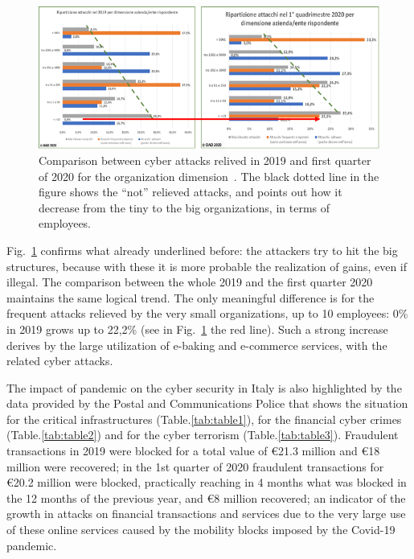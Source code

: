 \documentclass{easychair}
\begin{document}
\begin{figure}
	\centering
		\includegraphics[width=1\textwidth]{pictures/fig3.png}
		\caption{Comparison between cyber attacks relived in 2019 and first quarter of 2020 for the organization dimension~\cite{oad20}. The black dotted line in the figure shows 
the “not” relieved attacks, and points out how it decrease from the tiny to the big organizations, in terms of employees. }
		\label{fig:3}
\end{figure}

Fig.~\ref{fig:3} confirms what already underlined before: the attackers try to hit the big structures, because with these it is more probable the realization of gains, even if illegal.
The comparison between the whole 2019 and the first quarter 2020 maintains the same logical trend. The only meaningful difference is for the frequent attacks relieved by the very
small organizations, up to 10 employees: 0\% in 2019 grows up to 22,2\% (see in Fig.~\ref{fig:3} the red line). Such a strong increase derives by the large utilization of e-baking and 
e-commerce services, with the related cyber attacks.

The impact of pandemic on the cyber security in Italy is also highlighted by the data provided by the Postal and Communications Police that shows the situation for the
critical infrastructures (Table.\ref{tab:table1}), for the financial cyber crimes (Table.\ref{tab:table2}) and for the cyber terrorism (Table.\ref{tab:table3}). 
Fraudulent transactions in 2019 were blocked for a total value of \euro 21.3 million and \euro 18 million were recovered; in the 1st quarter of 
2020 fraudulent transactions for \euro 20.2 million were blocked, practically reaching in 4 months what was blocked in the 12 months of the previous year, and \euro 8 million 
recovered; an indicator of the growth in attacks on financial transactions and services due to the very large use of these online services caused by the mobility blocks imposed 
by the Covid-19 pandemic.
\end{document}
